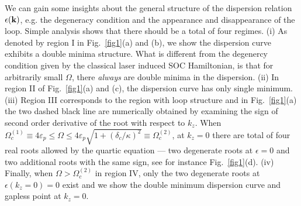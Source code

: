 \documentclass[atoms,article,submit,moreauthors,pdftex,12pt,a4paper]{mdpi}
\begin{document}
We can gain some insights about the general structure of the dispersion relation $\epsilon({\bf k})$, e.g. the degeneracy condition and the appearance and disappearance of the loop. 
Simple analysis shows that there should be a total of four regimes. 
(i) As denoted by region I in Fig.~\ref{fig1}(a) and (b), we show the dispersion curve exhibits a double minima structure. What is different from the degenercy condition given by the classical laser induced SOC Hamiltonian, is that for arbitrarily small $\Omega$, there {\em always} are double minima in the dispersion. 
(ii) In region II of Fig.~\ref{fig1}(a) and (c), the dispersion curve has only single minimum. 
(iii) Region III corresponds to the region with loop structure and in Fig.~\ref{fig1}(a) the two dashed black line are numerically obtained by examining the sign of second order derivative of the root with respect to $k_z$. When $\Omega_c^{(1)}\equiv4\varepsilon_p\leq \Omega \leq  4\varepsilon_p \sqrt{1+(\delta_c/\kappa)^2}\equiv\Omega_c^{(2)}$, at $k_z=0$ there are total of four real roots allowed by the quartic equation --- two degenerate roots at $\epsilon=0$ and two additional roots with the same sign, see for instance Fig.~\ref{fig1}(d). 
(iv) Finally, when $\Omega > \Omega_c^{(2)}$ in region IV, only the two degenerate roots at $\epsilon(k_z=0)=0$ exist and we show the double minimum dispersion curve and gapless point at $k_z=0$.  
\end{document}
